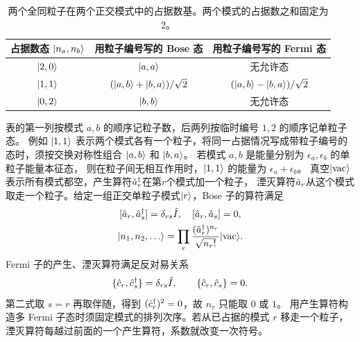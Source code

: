 \begin{table}[htbp]
    \centering
    \caption{两个全同粒子在两个正交模式中的占据数基。两个模式的占据数之和固定为2。}
    \label{tab:two-mode-occupations}
    \begin{tabular}{ccc}
        \toprule
        占据数态 $\lvert n_a,n_b\rangle$ & 用粒子编号写的 Bose 态 & 用粒子编号写的 Fermi 态 \\
        \midrule
        $\lvert2,0\rangle$ & $\lvert a,a\rangle$ & 无允许态 \\
        $\lvert1,1\rangle$ & $(\lvert a,b\rangle + \lvert b,a\rangle)/\sqrt2$ & $(\lvert a,b\rangle - \lvert b,a\rangle)/\sqrt2$ \\
        $\lvert0,2\rangle$ & $\lvert b,b\rangle$ & 无允许态 \\
        \bottomrule
    \end{tabular}
\end{table}

表的第一列按模式 $a,b$ 的顺序记粒子数，后两列按临时编号 $1,2$ 的顺序记单粒子态。
例如 $\lvert1,1\rangle$ 表示两个模式各有一个粒子，将同一占据情况写成带粒子编号的态时，须按交换对称性组合 $\lvert a,b\rangle$ 和 $\lvert b,a\rangle$。
若模式 $a,b$ 是能量分别为 $\epsilon_a,\epsilon_b$ 的单粒子能量本征态，
则在粒子间无相互作用时，$\lvert1,1\rangle$ 的能量为 $\epsilon_a + \epsilon_b$。
真空$\lvert\mathrm{vac}\rangle$表示所有模式都空，产生算符$\hat{a}_r^\dagger$在第$r$个模式加一个粒子，
湮灭算符$\hat{a}_r$从这个模式取走一个粒子。给定一组正交单粒子模式$\lvert r\rangle$，Bose 子的算符满足
\begin{subequations}
    \begin{gather}
        [\hat{a}_r,\hat{a}_s^\dagger] = \delta_{rs}\hat{I},\quad [\hat{a}_r,\hat{a}_s] = 0,\\
        \lvert n_1,n_2,\ldots\rangle =
        \prod_r\frac{(\hat{a}_r^\dagger)^{n_r}}{\sqrt{n_r!}}\lvert\mathrm{vac}\rangle.
    \end{gather}
\end{subequations}
Fermi 子的产生、湮灭算符满足反对易关系
\begin{equation}
    \{\hat{c}_r,\hat{c}_s^\dagger\} = \delta_{rs}\hat{I},\qquad
    \{\hat{c}_r,\hat{c}_s\} = 0.
\end{equation}
第二式取 $s = r$ 再取伴随，得到 $(\hat{c}_r^\dagger)^2 = 0$，故 $n_r$ 只能取 $0$ 或 $1$。
用产生算符构造多 Fermi 子态时须固定模式的排列次序。若从已占据的模式 $r$ 移走一个粒子，湮灭算符每越过前面的一个产生算符，系数就改变一次符号。

